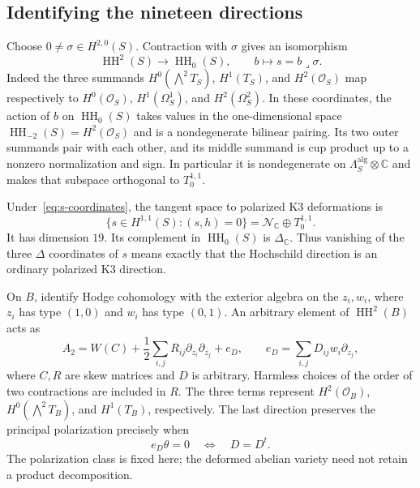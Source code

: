 \documentclass[11pt]{article}
\numberwithin{equation}{section}
\theoremstyle{definition}
\theoremstyle{remark}
\newcommand{\C}{\mathbb C}
\newcommand{\HH}{\operatorname{HH}}
\begin{document}
\subsection{Identifying the nineteen directions}

Choose $0\ne\sigma\in H^{2,0}(S)$. Contraction with $\sigma$ gives
an isomorphism
\begin{equation}\label{eq:s-coordinates}
 \HH^2(S)\longrightarrow\HH_0(S),\qquad b\longmapsto s=b\lrcorner\sigma.
\end{equation}
Indeed the three summands $H^0(\bigwedge^2T_S)$, $H^1(T_S)$, and
$H^2(\mathcal O_S)$ map respectively to $H^0(\mathcal O_S)$,
$H^1(\Omega_S^1)$, and $H^2(\Omega_S^2)$.
In these coordinates, the action of $b$ on $\HH_0(S)$ takes values
in the one-dimensional space $\HH_{-2}(S)=H^2(\mathcal O_S)$ and is
a nondegenerate bilinear pairing. Its two outer summands pair with
each other, and its middle summand is cup product up to a nonzero
normalization and sign. In particular it is nondegenerate on
$\Lambda_S^{\mathrm{alg}}\otimes\C$ and makes that subspace
orthogonal to $T_0^{1,1}$.

Under~\eqref{eq:s-coordinates}, the tangent space to polarized K3
deformations is
\begin{equation}\label{eq:polarized-K3-tangent}
 \{s\in H^{1,1}(S):(s,h)=0\}
       =\mathcal N_\C\oplus T_0^{1,1}.
\end{equation}
It has dimension $19$. Its complement in $\HH_0(S)$ is $\Delta_\C$.
Thus vanishing of the three $\Delta$ coordinates of $s$ means exactly
that the Hochschild direction is an ordinary polarized K3 direction.

On $B$, identify Hodge cohomology with the exterior algebra on the
$z_i,w_i$, where $z_i$ has type $(1,0)$ and $w_i$ has type $(0,1)$.
An arbitrary element of $\HH^2(B)$ acts as
\begin{equation}\label{eq:torus-HH-action}
 A_2=W(C)+\frac12\sum_{i,j}R_{ij}\partial_{z_i}\partial_{z_j}+e_D,
 \qquad e_D=\sum_{i,j}D_{ij}w_i\partial_{z_j},
\end{equation}
where $C,R$ are skew matrices and $D$ is arbitrary. Harmless choices
of the order of two contractions are included in $R$. The three
terms represent $H^2(\mathcal O_B)$, $H^0(\bigwedge^2T_B)$, and
$H^1(T_B)$, respectively. The last direction preserves the principal
polarization precisely when
\[
 e_D\theta=0\quad\Longleftrightarrow\quad D=D^t.
\]
The polarization class is fixed here; the deformed abelian variety
need not retain a product decomposition.
\end{document}
